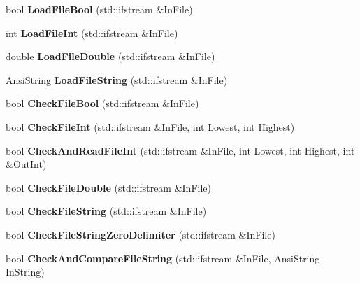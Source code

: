 \begin{DoxyCompactItemize}
bool {\bfseries Load\+File\+Bool} (std\+::ifstream \&In\+File)
\item 
\mbox{\label{class_t_utilities_a84bf39701305cf4814377d178d0fec8c}} 
int {\bfseries Load\+File\+Int} (std\+::ifstream \&In\+File)
\item 
\mbox{\label{class_t_utilities_ac970a0df84f5cb26ed962020b7dc2d6d}} 
double {\bfseries Load\+File\+Double} (std\+::ifstream \&In\+File)
\item 
\mbox{\label{class_t_utilities_a0aac90f10a08736514da3b3e02129e1e}} 
Ansi\+String {\bfseries Load\+File\+String} (std\+::ifstream \&In\+File)
\item 
\mbox{\label{class_t_utilities_a1b39fffcd392bfb0f5a2ca393de3a6bb}} 
bool {\bfseries Check\+File\+Bool} (std\+::ifstream \&In\+File)
\item 
\mbox{\label{class_t_utilities_a4d229af6e8943da1936bcbcc1c83846b}} 
bool {\bfseries Check\+File\+Int} (std\+::ifstream \&In\+File, int Lowest, int Highest)
\item 
\mbox{\label{class_t_utilities_ab4b66aa7480fda73d554fe0bcca82b60}} 
bool {\bfseries Check\+And\+Read\+File\+Int} (std\+::ifstream \&In\+File, int Lowest, int Highest, int \&Out\+Int)
\item 
\mbox{\label{class_t_utilities_a5c7332a6b45894902f271f0ab9ab87db}} 
bool {\bfseries Check\+File\+Double} (std\+::ifstream \&In\+File)
\item 
\mbox{\label{class_t_utilities_a7896a24d025c8164b2c8215944d072aa}} 
bool {\bfseries Check\+File\+String} (std\+::ifstream \&In\+File)
\item 
\mbox{\label{class_t_utilities_a8bc6745e0433d55022e016b6551f04a0}} 
bool {\bfseries Check\+File\+String\+Zero\+Delimiter} (std\+::ifstream \&In\+File)
\item 
\mbox{\label{class_t_utilities_a6a03c1597e2cc5d71c2f88ac36f11363}} 
bool {\bfseries Check\+And\+Compare\+File\+String} (std\+::ifstream \&In\+File, Ansi\+String In\+String)

\end{DoxyCompactItemize}
